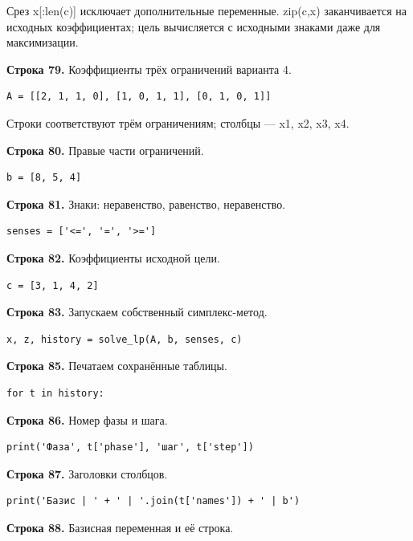 \documentclass[12pt,a4paper]{article}
\begin{document}
Срез x[:len(c)] исключает дополнительные переменные. zip(c,x) заканчивается на исходных коэффициентах; цель вычисляется с исходными знаками даже для максимизации.
\par\textbf{Строка 79.} Коэффициенты трёх ограничений варианта 4.
\begin{Verbatim}[fontsize=\small,breaklines=true,breakanywhere=true]
A = [[2, 1, 1, 0], [1, 0, 1, 1], [0, 1, 0, 1]]
\end{Verbatim}
Строки соответствуют трём ограничениям; столбцы --- x1, x2, x3, x4.
\par\textbf{Строка 80.} Правые части ограничений.
\begin{Verbatim}[fontsize=\small,breaklines=true,breakanywhere=true]
b = [8, 5, 4]
\end{Verbatim}
\par\textbf{Строка 81.} Знаки: неравенство, равенство, неравенство.
\begin{Verbatim}[fontsize=\small,breaklines=true,breakanywhere=true]
senses = ['<=', '=', '>=']
\end{Verbatim}
\par\textbf{Строка 82.} Коэффициенты исходной цели.
\begin{Verbatim}[fontsize=\small,breaklines=true,breakanywhere=true]
c = [3, 1, 4, 2]
\end{Verbatim}
\par\textbf{Строка 83.} Запускаем собственный симплекс-метод.
\begin{Verbatim}[fontsize=\small,breaklines=true,breakanywhere=true]
x, z, history = solve_lp(A, b, senses, c)
\end{Verbatim}
\par\textbf{Строка 85.} Печатаем сохранённые таблицы.
\begin{Verbatim}[fontsize=\small,breaklines=true,breakanywhere=true]
for t in history:
\end{Verbatim}
\par\textbf{Строка 86.} Номер фазы и шага.
\begin{Verbatim}[fontsize=\small,breaklines=true,breakanywhere=true]
    print('Фаза', t['phase'], 'шаг', t['step'])
\end{Verbatim}
\par\textbf{Строка 87.} Заголовки столбцов.
\begin{Verbatim}[fontsize=\small,breaklines=true,breakanywhere=true]
    print('Базис | ' + ' | '.join(t['names']) + ' | b')
\end{Verbatim}
\par\textbf{Строка 88.} Базисная переменная и её строка.
\end{document}
